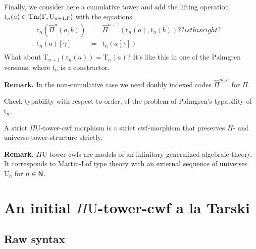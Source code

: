 \documentclass{lmcs}
\def\UU{\mathrm{U}}
\def\Ta{\mathrm{T}}
\def\Pihat{\hat{\Pi}}
\def\t{\mathrm{t}}
\begin{document}
Finally, we consider here a cumulative tower and add the lifting operation $\t_n(a) \in \Tm(\Gamma,\UU_{n+1,\Gamma})$ with the equations
\begin{eqnarray*}
\t_n(\Pihat^n(a,b)) &= &\Pihat^{n+1}(\t_n(a),\t_n(b))?? is this right?\\
\t_n(a)[\gamma] &=& \t_n(a[\gamma])\\
\end{eqnarray*}
What about $\Ta_{n+1}(\t_n(a)) = \Ta_n(a)$? It's like this in one of the Palmgren versions, where $\t_n$ is a constructor.

{\bf Remark.} In the non-cumulative case we need doubly indexed codes $\Pihat^{m,n}$ for $\Pi$.

Check typability with respect to order, cf the problem of Palmgren's typability of $\t_n$.

A strict $\Pi\UU$-tower-cwf morphism is a strict cwf-morphism that preserves $\Pi$- and universe-tower-structure strictly.

{\bf Remark.} $\Pi\UU$-tower-cwfs are models of an infinitary generalized algebraic theory. It corresponds to Martin-Löf type theory with an external sequence of universes $\UU_n$ for $n \in \mathsf{N}$.

\section{An initial $\Pi\UU$-tower-cwf a la Tarski}
\label{sec:syntax}
\subsection{Raw syntax}\label{sec:grammar}
\end{document}
